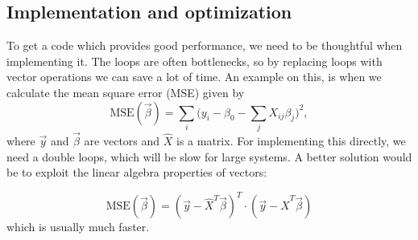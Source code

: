 \subsection{Implementation and optimization} \label{sec:implementation}
To get a code which provides good performance, we need to be thoughtful when implementing it. The loops are often bottlenecks, so by replacing loops with vector operations we can save a lot of time. An example on this, is when we calculate the mean square error (MSE) given by
\begin{equation}
\text{MSE}(\vec{\beta})=\sum_i\bigg(y_i-\beta_0-\sum_jX_{ij}\beta_j\bigg)^2,
\end{equation}
where $\vec{y}$ and $\vec{\beta}$ are vectors and $\hat{X}$ is a matrix. For implementing this directly, we need a double loops, which will be slow for large systems. A better solution would be to exploit the linear algebra properties of vectors:

\begin{equation}
\text{MSE}(\vec{\beta})=(\vec{y}-\hat{X}^T\vec{\beta})^T\cdot(\vec{y}-\hat{X}^T\vec{\beta})
\end{equation}
which is usually much faster. 